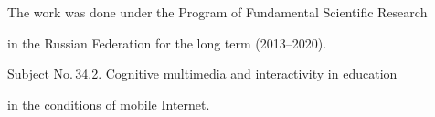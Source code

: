 












\vspace*{-9pt}





\Ack


\noindent


The work was done under the Program of Fundamental Scientific Research 


in the Russian Federation for the long term (2013--2020). 


Subject No.\,34.2. Cognitive multimedia and interactivity in education 


in the conditions of mobile Internet.
























